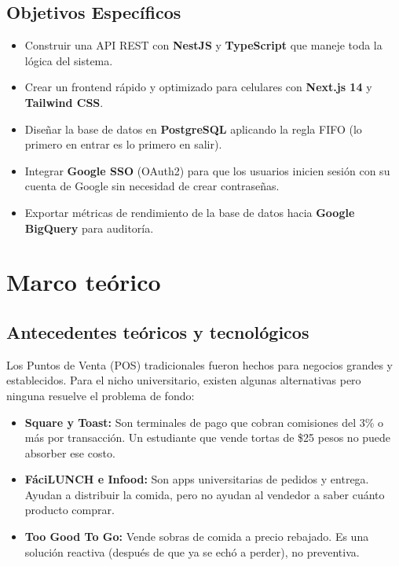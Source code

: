 \documentclass[12pt, a4paper]{article}
\begin{document}
\subsection{Objetivos Específicos}
\begin{itemize}
    \item Construir una API REST con \textbf{NestJS} y \textbf{TypeScript} que maneje toda la lógica del sistema.
    \item Crear un frontend rápido y optimizado para celulares con \textbf{Next.js 14} y \textbf{Tailwind CSS}.
    \item Diseñar la base de datos en \textbf{PostgreSQL} aplicando la regla FIFO (lo primero en entrar es lo primero en salir).
    \item Integrar \textbf{Google SSO} (OAuth2) para que los usuarios inicien sesión con su cuenta de Google sin necesidad de crear contraseñas.
    \item Exportar métricas de rendimiento de la base de datos hacia \textbf{Google BigQuery} para auditoría.
\end{itemize}

\section{Marco teórico}

\subsection{Antecedentes teóricos y tecnológicos}
Los Puntos de Venta (POS) tradicionales fueron hechos para negocios grandes y establecidos. Para el nicho universitario, existen algunas alternativas pero ninguna resuelve el problema de fondo:

\begin{itemize}
    \item \textbf{Square y Toast:} Son terminales de pago que cobran comisiones del 3\% o más por transacción. Un estudiante que vende tortas de \$25 pesos no puede absorber ese costo.
    \item \textbf{FáciLUNCH e Infood:} Son apps universitarias de pedidos y entrega. Ayudan a distribuir la comida, pero no ayudan al vendedor a saber cuánto producto comprar.
    \item \textbf{Too Good To Go:} Vende sobras de comida a precio rebajado. Es una solución reactiva (después de que ya se echó a perder), no preventiva.
\end{itemize}
\end{document}
